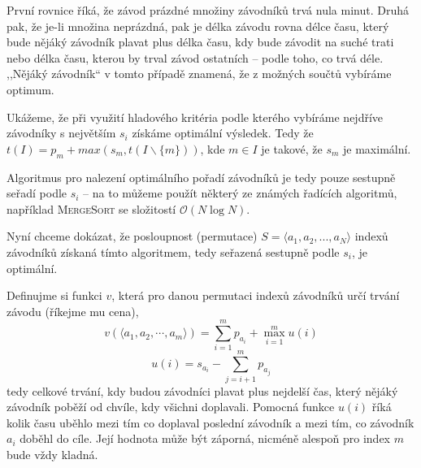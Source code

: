 \documentclass[12pt]{article}
\newcommand{\la}{\leftarrow}
\renewcommand{\O}{\mathcal{O}}
\begin{document}
První rovnice říká, že závod prázdné množiny závodníků trvá nula minut. Druhá pak, že je-li množina
neprázdná, pak je délka závodu rovna délce času, který bude nějáký závodník plavat plus délka času,
kdy bude závodit na suché trati nebo délka času, kterou by trval závod ostatních -- podle
toho, co trvá déle. ,,Nějáký závodník`` v tomto případě znamená, že z možných součtů vybíráme
optimum.

Ukážeme, že při využití hladového kritéria podle kterého vybíráme nejdříve závodníky s největším
$s_i$ získáme optimální výsledek. Tedy že $t(I) = p_m + max(s_m, t(I \smallsetminus \{m\}))$, kde $m
\in I$ je takové, že $s_m$ je maximální.

Algoritmus pro nalezení optimálního pořadí závodníků je tedy pouze sestupně seřadí podle $s_i$ -- na
to můžeme použít některý ze známých řadících algoritmů, například \textsc{MergeSort} se složitostí
$\O(N\log N)$.

%
%

\bigskip

\noindent
Nyní chceme dokázat, že posloupnost (permutace) $S = \langle a_1,a_2,...,a_N \rangle$ indexů
závodníků získaná tímto algoritmem, tedy seřazená sestupně podle $s_i$, je optimální.

Definujme si funkci $v$, která pro danou permutaci indexů závodníků určí trvání závodu (říkejme mu cena),
$$ v(\langle a_1,a_2,\cdots,a_m \rangle) = \sum_{i=1}^m p_{a_i} + \max_{i=1}^m u(i)$$
$$ u(i) = s_{a_i} - \sum_{j=i+1}^m p_{a_j}$$
tedy celkové trvání, kdy budou závodníci plavat plus nejdelší čas, který nějáký závodník poběží od
chvíle, kdy všichni doplavali. Pomocná funkce $u(i)$ říká kolik času uběhlo mezi tím co doplaval
poslední závodník a mezi tím, co závodník $a_i$ doběhl do cíle. Její hodnota může být záporná,
nicméně alespoň pro index $m$ bude vždy kladná.
\end{document}
